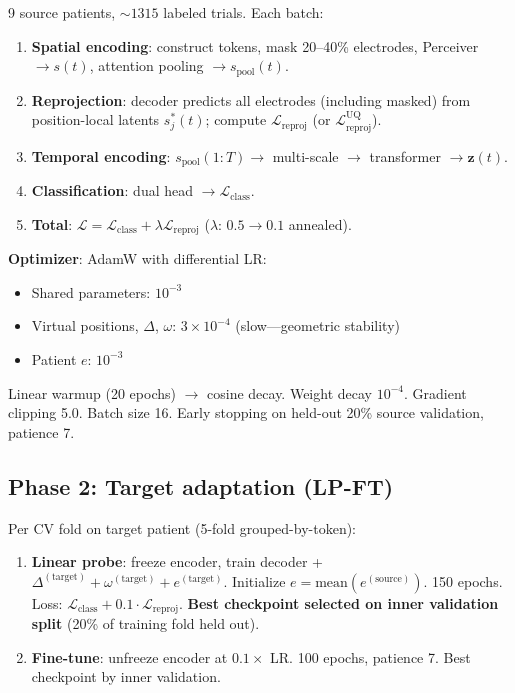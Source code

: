 \documentclass[11pt,letterpaper]{article}
\newcommand{\bfz}{\mathbf{z}}
\begin{document}
9 source patients, ${\sim}1315$ labeled trials. Each batch:
\begin{enumerate}[leftmargin=2em]
\item \textbf{Spatial encoding}: construct tokens, mask 20--40\% electrodes, Perceiver $\to s(t)$, attention pooling $\to s_{\text{pool}}(t)$.
\item \textbf{Reprojection}: decoder predicts all electrodes (including masked) from position-local latents $s_j^*(t)$; compute $\mathcal{L}_{\text{reproj}}$ (or $\mathcal{L}_{\text{reproj}}^{\text{UQ}}$).
\item \textbf{Temporal encoding}: $s_{\text{pool}}(1{:}T) \to$ multi-scale $\to$ transformer $\to \bfz(t)$.
\item \textbf{Classification}: dual head $\to \mathcal{L}_{\text{class}}$.
\item \textbf{Total}: $\mathcal{L} = \mathcal{L}_{\text{class}} + \lambda \mathcal{L}_{\text{reproj}}$ ($\lambda$: $0.5 \to 0.1$ annealed).
\end{enumerate}

\textbf{Optimizer}: AdamW with differential LR:
\begin{itemize}[leftmargin=2em]
\item Shared parameters: $10^{-3}$
\item Virtual positions, $\Delta$, $\omega$: $3 \times 10^{-4}$ (slow---geometric stability)
\item Patient $e$: $10^{-3}$
\end{itemize}

Linear warmup (20 epochs) $\to$ cosine decay. Weight decay $10^{-4}$. Gradient clipping 5.0. Batch size 16. Early stopping on held-out 20\% source validation, patience 7.

\subsection{Phase 2: Target adaptation (LP-FT)}

Per CV fold on target patient (5-fold grouped-by-token):
\begin{enumerate}[leftmargin=2em]
\item \textbf{Linear probe}: freeze encoder, train decoder + $\Delta^{(\text{target})} + \omega^{(\text{target})} + e^{(\text{target})}$. Initialize $e = \text{mean}(e^{(\text{source})})$. 150 epochs. Loss: $\mathcal{L}_{\text{class}} + 0.1 \cdot \mathcal{L}_{\text{reproj}}$. \textbf{Best checkpoint selected on inner validation split} (20\% of training fold held out).
\item \textbf{Fine-tune}: unfreeze encoder at $0.1\times$ LR. 100 epochs, patience 7. Best checkpoint by inner validation.
\end{enumerate}
\end{document}
